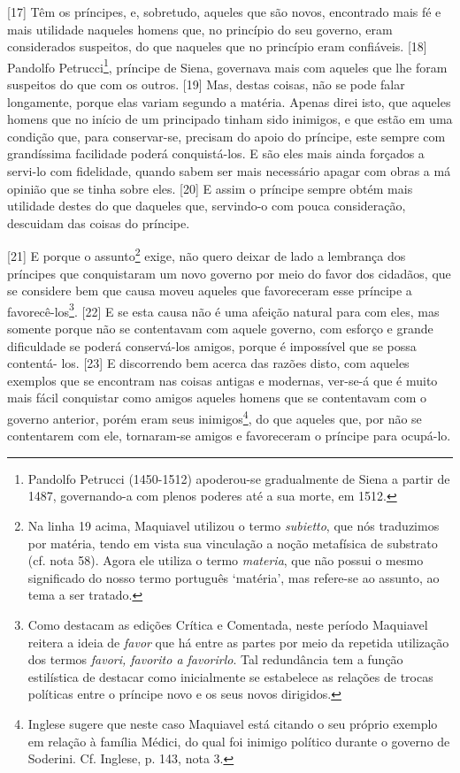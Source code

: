 {[}17{]} Têm os príncipes, e, sobretudo, aqueles que são novos,
encontrado mais fé e mais utilidade naqueles homens que, no princípio do
seu governo, eram considerados suspeitos, do que naqueles que no
princípio eram confiáveis. {[}18{]} Pandolfo Petrucci\footnote{Pandolfo
  Petrucci (1450-1512) apoderou-se gradualmente de Siena a partir de
  1487, governando-a com plenos poderes até a sua morte, em 1512.},
príncipe de Siena, governava mais com aqueles que lhe foram suspeitos do
que com os outros. {[}19{]} Mas, destas coisas, não se pode falar
longamente, porque elas variam segundo a matéria. Apenas direi isto, que
aqueles homens que no início de um principado tinham sido inimigos, e
que estão em uma condição que, para conservar-se, precisam do apoio do
príncipe, este sempre com grandíssima facilidade poderá conquistá-los. E
são eles mais ainda forçados a servi-lo com fidelidade, quando sabem ser
mais necessário apagar com obras a má opinião que se tinha sobre eles.
{[}20{]} E assim o príncipe sempre obtém mais utilidade destes do que
daqueles que, servindo-o com pouca consideração, descuidam das coisas do
príncipe.

{[}21{]} E porque o assunto\footnote{Na linha 19 acima, Maquiavel
  utilizou o termo \emph{subietto}, que nós traduzimos por matéria,
  tendo em vista sua vinculação a noção metafísica de substrato (cf.
  nota 58). Agora ele utiliza o termo \emph{materia}, que não possui o
  mesmo significado do nosso termo português `matéria', mas refere-se ao
  assunto, ao tema a ser tratado.} exige, não quero deixar de lado a
lembrança dos príncipes que conquistaram um novo governo por meio do
favor dos cidadãos, que se considere bem que causa moveu aqueles que
favoreceram esse príncipe a favorecê-los\footnote{Como destacam as
  edições Crítica e Comentada, neste período Maquiavel reitera a ideia
  de \emph{favor} que há entre as partes por meio da repetida utilização
  dos termos \emph{favori, favorito a favorirlo}. Tal redundância tem a
  função estilística de destacar como inicialmente se estabelece as
  relações de trocas políticas entre o príncipe novo e os seus novos
  dirigidos.}. {[}22{]} E se esta causa não é uma afeição natural para
com eles, mas somente porque não se contentavam com aquele governo, com
esforço e grande dificuldade se poderá conservá-los amigos, porque é
impossível que se possa contentá- los. {[}23{]} E discorrendo bem acerca
das razões disto, com aqueles exemplos que se encontram nas coisas
antigas e modernas, ver-se-á que é muito mais fácil conquistar como
amigos aqueles homens que se contentavam com o governo anterior, porém
eram seus inimigos\footnote{Inglese sugere que neste caso Maquiavel está
  citando o seu próprio exemplo em relação à família Médici, do qual foi
  inimigo político durante o governo de Soderini. Cf. Inglese, p. 143,
  nota 3.}, do que aqueles que, por não se contentarem com ele,
tornaram-se amigos e favoreceram o príncipe para ocupá-lo.

